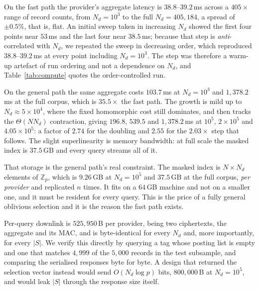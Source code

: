 \documentclass[a4paper,fleqn]{cas-dc}
\begin{document}
On the fast path the provider's aggregate latency is $38.8$--$39.2$\,ms across
a $405\times$ range of record counts, from $N_d=10^3$ to the full
$N_d=405{,}184$, a spread of $\pm0.5\%$, that is, flat. An initial sweep taken
in increasing $N_d$ showed the first four points near $53$\,ms and the last
four near $38.5$\,ms; because that step is \emph{anti}-correlated with $N_d$,
we repeated the sweep in decreasing order, which reproduced
$38.8$--$39.2$\,ms at every point including $N_d=10^3$. The step was therefore
a warm-up artefact of run ordering and not a dependence on $N_d$, and
Table~\ref{tab:compute} quotes the order-controlled run.

On the general path the same aggregate costs $103.7$\,ms at $N_d=10^3$ and
$1{,}378.2$\,ms at the full corpus, which is $35.5\times$ the fast path. The
growth is mild up to $N_d\approx5\times10^4$, where the fixed homomorphic cost
still dominates, and then tracks the $\Theta(N N_d)$ contraction, giving
$196.8$, $539.5$ and $1{,}378.2$\,ms at $10^5$, $2\times10^5$ and
$4.05\times10^5$: a factor of $2.74$ for the doubling and $2.55$ for the
$2.03\times$ step that follows. The slight superlinearity is memory
bandwidth: at full scale the masked index is $37.5$\,GB and every query
streams all of it.

That storage is the general path's real constraint. The masked index is
$N\times N_d$ elements of $\mathbb{Z}_p$, which is $9.26$\,GB at $N_d=10^5$
and $37.5$\,GB at the full corpus, \emph{per provider} and replicated $n$
times. It fits on a $64$\,GB machine and not on a smaller one, and it must be
resident for every query. This is the price of a fully general oblivious
selection and it is the reason the fast path exists.

Per-query downlink is $525{,}950$\,B per provider, being two ciphertexts, the
aggregate and its MAC, and is byte-identical for every $N_d$ and, more
importantly, for every $|S|$. We verify this directly by querying a tag whose
posting list is empty and one that matches $4{,}999$ of the $5{,}000$ records
in the test subsample, and comparing the serialised responses byte for byte. A
design that returned the selection vector instead would send $O(N_d\log p)$
bits, $800{,}000$\,B at $N_d=10^5$, and would leak $|S|$ through the response
size itself.
\end{document}
